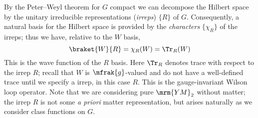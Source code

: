 \documentclass[a4paper
	,10pt
]{article}
\newcommand{\YM}{{\ensuremath{\mrm{YM}_2}}\xspace}
\begin{document}
	By the Peter--Weyl theorem for $G$ compact we can decompose the Hilbert space by the unitary irreducible representations (\textit{irreps}) $\{R\}$ of $G$. 
	Consequently, a natural basis for the Hilbert space is provided by the \textit{characters} $\{\chi_R\}$ of the irreps; thus we have, relative to the $W$ basis,
	\begin{equation}
		\braket{W}{R}
		= \chi_R (W)
		= \Tr_R (W)
	\end{equation}
	This is the wave function of the $R$ basis.
	Here $\Tr_R$ denotes trace with respect to the irrep $R$; recall that $W$ is $\mfrak{g}$-valued and do not have a well-defined trace until we specify a irrep, in this case $R$. This is the gauge-invariant Wilson loop operator. Note that we are considering pure \YM without matter; the irrep $R$ is not some \textit{a priori} matter representation, but arises naturally as we consider class functions on $G$. 
\end{document}
